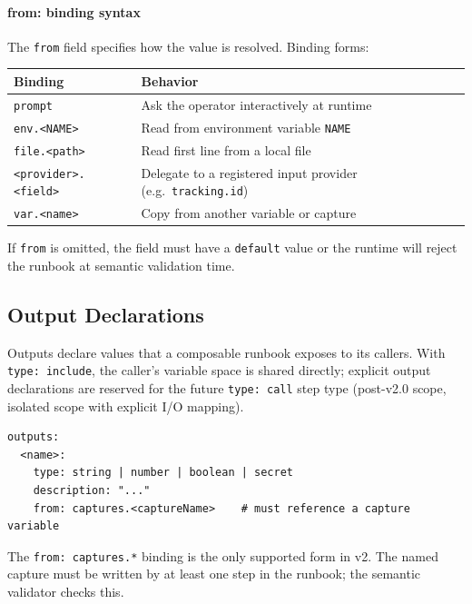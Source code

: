 \paragraph{from: binding syntax}

The \texttt{from} field specifies how the value is resolved.  Binding
forms:

\begin{center}
\begin{tabular}{lp{7.5cm}}
\hline
\textbf{Binding} & \textbf{Behavior} \\
\hline
\texttt{prompt}          & Ask the operator interactively at runtime \\
\texttt{env.<NAME>}      & Read from environment variable \texttt{NAME} \\
\texttt{file.<path>}     & Read first line from a local file \\
\texttt{<provider>.<field>} & Delegate to a registered input provider (e.g.\ \texttt{tracking.id}) \\
\texttt{var.<name>}      & Copy from another variable or capture \\
\hline
\end{tabular}
\end{center}

If \texttt{from} is omitted, the field must have a \texttt{default} value or the
runtime will reject the runbook at semantic validation time.

\subsection{Output Declarations}
\label{subsec:outputs}

Outputs declare values that a composable runbook exposes to its callers.
With \texttt{type: include}, the caller's variable space is shared directly;
explicit output declarations are reserved for the future \texttt{type: call}
step type (post-v2.0 scope, isolated scope with explicit I/O mapping).

\begin{verbatim}
outputs:
  <name>:
    type: string | number | boolean | secret
    description: "..."
    from: captures.<captureName>    # must reference a capture variable
\end{verbatim}

The \texttt{from: captures.*} binding is the only supported form in v2.
The named capture must be written by at least one step in the runbook; the
semantic validator checks this.

